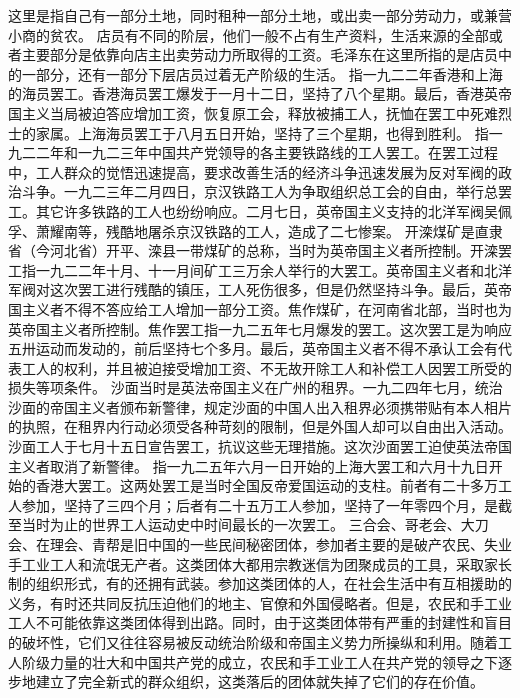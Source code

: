 \begin{maonote}
这里是指自己有一部分土地，同时租种一部分土地，或出卖一部分劳动力，或兼营小商的贫农。
店员有不同的阶层，他们一般不占有生产资料，生活来源的全部或者主要部分是依靠向店主出卖劳动力所取得的工资。毛泽东在这里所指的是店员中的一部分，还有一部分下层店员过着无产阶级的生活。
指一九二二年香港和上海的海员罢工。香港海员罢工爆发于一月十二日，坚持了八个星期。最后，香港英帝国主义当局被迫答应增加工资，恢复原工会，释放被捕工人，抚恤在罢工中死难烈士的家属。上海海员罢工于八月五日开始，坚持了三个星期，也得到胜利。
指一九二二年和一九二三年中国共产党领导的各主要铁路线的工人罢工。在罢工过程中，工人群众的觉悟迅速提高，要求改善生活的经济斗争迅速发展为反对军阀的政治斗争。一九二三年二月四日，京汉铁路工人为争取组织总工会的自由，举行总罢工。其它许多铁路的工人也纷纷响应。二月七日，英帝国主义支持的北洋军阀吴佩孚、萧耀南等，残酷地屠杀京汉铁路的工人，造成了二七惨案。
开滦煤矿是直隶省（今河北省）开平、滦县一带煤矿的总称，当时为英帝国主义者所控制。开滦罢工指一九二二年十月、十一月间矿工三万余人举行的大罢工。英帝国主义者和北洋军阀对这次罢工进行残酷的镇压，工人死伤很多，但是仍然坚持斗争。最后，英帝国主义者不得不答应给工人增加一部分工资。焦作煤矿，在河南省北部，当时也为英帝国主义者所控制。焦作罢工指一九二五年七月爆发的罢工。这次罢工是为响应五卅运动而发动的，前后坚持七个多月。最后，英帝国主义者不得不承认工会有代表工人的权利，并且被迫接受增加工资、不无故开除工人和补偿工人因罢工所受的损失等项条件。
沙面当时是英法帝国主义在广州的租界。一九二四年七月，统治沙面的帝国主义者颁布新警律，规定沙面的中国人出入租界必须携带贴有本人相片的执照，在租界内行动必须受各种苛刻的限制，但是外国人却可以自由出入活动。沙面工人于七月十五日宣告罢工，抗议这些无理措施。这次沙面罢工迫使英法帝国主义者取消了新警律。
指一九二五年六月一日开始的上海大罢工和六月十九日开始的香港大罢工。这两处罢工是当时全国反帝爱国运动的支柱。前者有二十多万工人参加，坚持了三四个月；后者有二十五万工人参加，坚持了一年零四个月，是截至当时为止的世界工人运动史中时间最长的一次罢工。
三合会、哥老会、大刀会、在理会、青帮是旧中国的一些民间秘密团体，参加者主要的是破产农民、失业手工业工人和流氓无产者。这类团体大都用宗教迷信为团聚成员的工具，采取家长制的组织形式，有的还拥有武装。参加这类团体的人，在社会生活中有互相援助的义务，有时还共同反抗压迫他们的地主、官僚和外国侵略者。但是，农民和手工业工人不可能依靠这类团体得到出路。同时，由于这类团体带有严重的封建性和盲目的破坏性，它们又往往容易被反动统治阶级和帝国主义势力所操纵和利用。随着工人阶级力量的壮大和中国共产党的成立，农民和手工业工人在共产党的领导之下逐步地建立了完全新式的群众组织，这类落后的团体就失掉了它们的存在价值。
\end{maonote}
